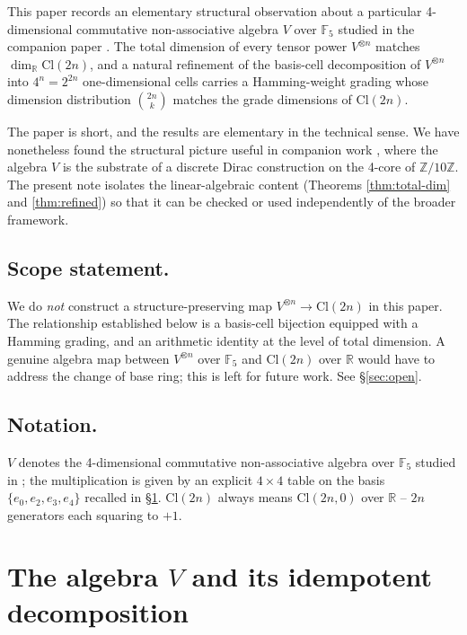 \documentclass[11pt,reqno]{amsart}
\theoremstyle{plain}
\theoremstyle{definition}
\theoremstyle{remark}
\newcommand{\Z}{\mathbb{Z}}
\newcommand{\F}{\mathbb{F}}
\newcommand{\R}{\mathbb{R}}
\newcommand{\Cl}{\mathrm{Cl}}
\begin{document}
This paper records an elementary structural observation about a
particular 4-dimensional commutative non-associative algebra $V$ over
$\F_5$ studied in the companion paper \cite{SandersGishDiscreteDirac}.
The total dimension of every tensor power $V^{\otimes n}$ matches
$\dim_\R \Cl(2n)$, and a natural refinement of the basis-cell
decomposition of $V^{\otimes n}$ into $4^n = 2^{2n}$ one-dimensional
cells carries a Hamming-weight grading whose dimension distribution
$\binom{2n}{k}$ matches the grade dimensions of $\Cl(2n)$.

The paper is short, and the results are elementary in the technical
sense.  We have nonetheless found the structural picture useful in
companion work \cite{SandersGishDiscreteDirac, SandersGishFpUniversality},
where the algebra $V$ is the substrate of a discrete Dirac construction
on the 4-core of $\Z/10\Z$.  The present note isolates the
linear-algebraic content (Theorems \ref{thm:total-dim} and
\ref{thm:refined}) so that it can be checked or used independently of
the broader framework.

\subsection*{Scope statement.}
We do \emph{not} construct a structure-preserving map
$V^{\otimes n} \to \Cl(2n)$ in this paper.  The relationship
established below is a basis-cell bijection equipped with a Hamming
grading, and an arithmetic identity at the level of total dimension.
A genuine algebra map between $V^{\otimes n}$ over $\F_5$ and
$\Cl(2n)$ over $\R$ would have to address the change of base ring;
this is left for future work.  See \S\ref{sec:open}.

\subsection*{Notation.}
$V$ denotes the 4-dimensional commutative non-associative algebra over
$\F_5$ studied in \cite{SandersGishDiscreteDirac}; the multiplication
is given by an explicit $4 \times 4$ table on the basis
$\{e_0, e_2, e_3, e_4\}$ recalled in \S\ref{sec:V}.
$\Cl(2n)$ always means $\Cl(2n, 0)$ over $\R$ -- $2n$ generators each
squaring to $+1$.

\section{The algebra $V$ and its idempotent decomposition}
\label{sec:V}
\end{document}
